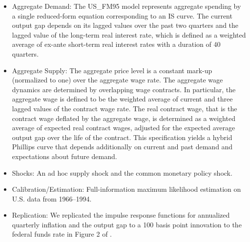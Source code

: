 \documentclass[11pt,a4paper]{article}
\begin{document}
	\begin{itemize}
		\item Aggregate Demand: The US\_FM95 model represents aggregate spending by a single reduced-form equation corresponding to an IS curve. The current output gap depends on its lagged values over the past two quarters and the lagged value of the long-term real interest rate, which is defined as a weighted average of ex-ante short-term real interest rates with a duration of 40 quarters. %
		\item Aggregate Supply: The aggregate price level is a constant mark-up (normalized to one) over the aggregate wage rate. The aggregate wage dynamics are determined by overlapping wage contracts. In particular, the aggregate wage is defined to be the weighted average of current and three lagged values of the contract wage rate. The real contract wage, that is the contract wage deflated by the aggregate wage, is determined as a weighted average of expected real contract wages, adjusted for the expected average output gap over the life of the contract. This specification yields a hybrid Phillips curve that depends additionally on current and past demand and expectations about future demand.
		\item Shocks: An ad hoc supply shock and the common monetary policy shock.
		\item Calibration/Estimation: Full-information maximum likelihood estimation on U.S. data from 1966--1994.
		\item Replication: We replicated the impulse response functions for annualized quarterly inflation and the output gap to a 100 basis point innovation to the federal funds rate in Figure 2 of \cite{LevinWielandWilliams2003}.

\end{itemize}
\end{document}
